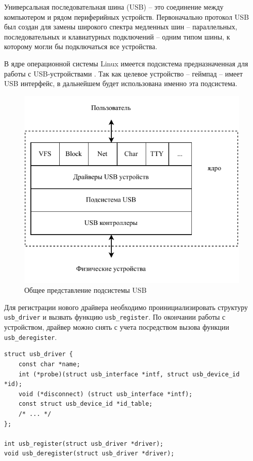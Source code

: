 Универсальная последовательная шина (USB) -- это соединение между компьютером и рядом периферийных устройств. Первоначально протокол USB был создан для замены широкого спектра медленных шин -- параллельных, последовательных и клавиатурных подключений -- одним типом шины, к которому могли бы подключаться все устройства.

В ядре операционной системы Linux имеется подсистема предназначенная для работы с USB-устройствами \cite{usb-basics}. Так как целевое устройство -- геймпад -- имеет USB интерфейс, в дальнейшем будет использована именно эта подсистема.

\clearpage

\begin{figure}[ht]
    \centering
    \includegraphics[width=0.8\linewidth]{img/usb-overview.pdf}
    \caption{Общее представление подсистемы USB}
\end{figure}

Для регистрации нового драйвера необходимо проинициализировать структуру \texttt{usb\_driver} и вызвать функцию \texttt{usb\_register}. По окончании работы с устройством, драйвер можно снять с учета посредством вызова функции \texttt{usb\_deregister}. 

\begin{small}
\begin{verbatim}
struct usb_driver {
    const char *name;
    int (*probe)(struct usb_interface *intf, struct usb_device_id *id);
    void (*disconnect) (struct usb_interface *intf);
    const struct usb_device_id *id_table;
    /* ... */
};

int usb_register(struct usb_driver *driver);
void usb_deregister(struct usb_driver *driver);
\end{verbatim}
\end{small}

